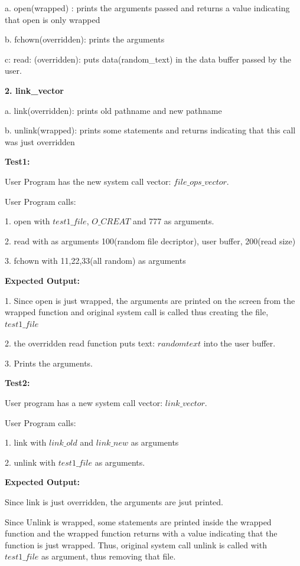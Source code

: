\documentclass[11pt]{article}
\begin{document}
    a. open(wrapped) : prints the arguments passed and returns a value indicating that open is only wrapped  

    b. fchown(overridden): prints the arguments

    c: read: (overridden): puts data(random\_text) in the data buffer passed by the user. 

\medskip
\noindent
\textbf{2. link\_vector}

    a. link(overridden): prints old pathname and new pathname

    b. unlink(wrapped): prints some statements and returns indicating that this call was just overridden

\medskip
\noindent
\textbf{Test1:}

User Program has the new system call vector: $file\_ops\_vector$. 

User Program calls:

1. open with $test1\_file$, $O\_CREAT$ and 777 as arguments. 

2. read with as arguments 100(random file decriptor), user buffer, 200(read size)

3. fchown with 11,22,33(all random) as arguments 

\noindent
\textbf{Expected Output: }

1. Since open is just wrapped, the arguments are printed on the screen from the wrapped function and original system call is called thus creating the file, $test1\_file$

2. the overridden read function puts text: $random text$ into the user buffer. 

3. Prints the arguments. 

\medskip
\noindent
\textbf{Test2:} 

User program has a new system call vector: $link\_vector$. 

User Program calls:

1. link with $link\_old$ and $link\_new$ as arguments

2. unlink with $test1\_file$ as arguments. 

\noindent
\textbf{Expected Output: }

Since link is just overridden, the arguments are jsut printed.

Since Unlink is wrapped, some statements are printed inside the wrapped function and the wrapped function returns with a value indicating that the function is just wrapped. Thus, original system call unlink is called with $test1\_file$ as argument, thus removing that file.
\end{document}
